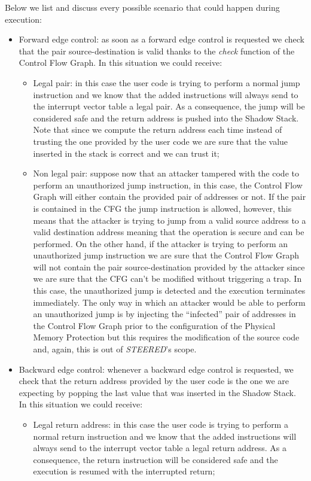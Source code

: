 Below we list and discuss every possible scenario that could happen during execution:
\begin{itemize}
  \item Forward edge control: as soon as a forward edge control is requested we
    check that the pair source-destination is valid thanks to the \textit{check}
    function of the Control Flow Graph. In this situation we could receive:
    \begin{itemize}
      \item Legal pair: in this case the user code is trying to perform a normal
        jump instruction and we know that the added instructions will always
        send to the interrupt vector table a legal pair. As a consequence, the
        jump will be considered safe and the return address is pushed into the
        Shadow Stack. Note that since we compute the return address each time instead
        of trusting the one provided by the user code we are sure that the value
        inserted in the stack is correct and we can trust it;

      \item Non legal pair: suppose now that an attacker tampered with the code
        to perform an unauthorized jump instruction, in this case, the Control
        Flow Graph will either contain the provided pair of addresses or not. If
        the pair is contained in the CFG the jump instruction is allowed,
        however, this means that the attacker is trying to jump from a valid source
        address to a valid destination address meaning that the operation is secure
        and can be performed. On the other hand, if the attacker is trying to perform
        an unauthorized jump instruction we are sure that the Control Flow Graph
        will not contain the pair source-destination provided by the attacker since
        we are sure that the CFG can't be modified without triggering a trap. In
        this case, the unauthorized jump is detected and the execution terminates
        immediately. The only way in which an attacker would be able to perform
        an unauthorized jump is by injecting the ``infected'' pair of addresses
        in the Control Flow Graph prior to the configuration of the Physical
        Memory Protection but this requires the modification of the source code
        and, again, this is out of \textit{STEERED}'s scope.
    \end{itemize}

  \item Backward edge control: whenever a backward edge control is requested, we
    check that the return address provided by the user code is the one we are expecting
    by popping the last value that was inserted in the Shadow Stack. In this
    situation we could receive:
    \begin{itemize}
      \item Legal return address: in this case the user code is trying to
        perform a normal return instruction and we know that the added
        instructions will always send to the interrupt vector table a legal
        return address. As a consequence, the return instruction will be
        considered safe and the execution is resumed with the interrupted return;


\end{itemize}
\end{itemize}
